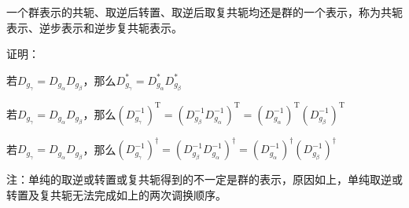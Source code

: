 \begin{corollary}{}
一个群表示的共轭、取逆后转置、取逆后取复共轭均还是群的一个表示，称为共轭表示、逆步表示和逆步复共轭表示。
\end{corollary}

证明：

若$D_{g_\gamma}=D_{g_\alpha}D_{g_\beta}$，那么$D_{g_\gamma}^*=D_{g_\alpha}^*D_{g_\beta}^*$

若$D_{g_\gamma}=D_{g_\alpha}D_{g_\beta}$，那么$(D_{g_\gamma}^{-1})^\mathrm{T}=(D_{g_\beta}^{-1}D_{g_\alpha}^{-1})^\mathrm{T}=(D_{g_\alpha}^{-1})^\mathrm{T}(D_{g_\beta}^{-1})^\mathrm{T}$

若$D_{g_\gamma}=D_{g_\alpha}D_{g_\beta}$，那么$(D_{g_\gamma}^{-1})^\dagger=(D_{g_\beta}^{-1}D_{g_\alpha}^{-1})^\dagger=(D_{g_\alpha}^{-1})^\dagger(D_{g_\beta}^{-1})^\dagger$

注：单纯的取逆或转置或复共轭得到的不一定是群的表示，原因如上，单纯取逆或转置及复共轭无法完成如上的两次调换顺序。